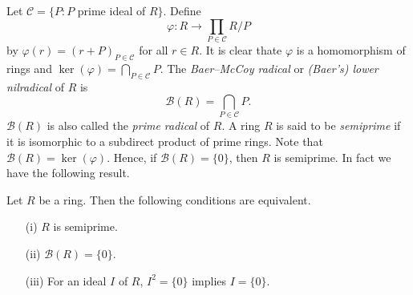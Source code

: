 Let $\mathcal{C}=\{ P : P$ prime ideal of $R\}$. Define
\[
\varphi\colon R\rightarrow \prod_{P\in\mathcal{C}}R/P
\]
by $\varphi (r)=(r+P)_{P\in\mathcal{C}}$ for all $r\in R$. It is clear thate $\varphi$ 
is a homomorphism of rings and $\ker(\varphi
)=\bigcap_{P\in \mathcal{C}}P$. The \emph{Baer--McCoy radical} or \emph{(Baer's) lower nilradical} of $R$ is
$$\mathcal{B}(R)=\bigcap_{P\in\mathcal{C}}P.$$
$\mathcal{B}(R)$ is also called the \emph{prime radical} of $R$.
A ring $R$ is said to be \emph{semiprime} if it is isomorphic to a subdirect product of prime rings.
Note that $\mathcal{B}(R)=\ker(\varphi)$. Hence, if $\mathcal{B}(R)=\{0\}$, then $R$ is semiprime. 
In fact we have the following result.

\begin{theorem}\label{Teorema 1.3.6}
Let $R$ be a ring. Then the following conditions are equivalent.
\begin{itemize}\item[(i)] $R$ is semiprime.
\item[(ii)] $\mathcal{B}(R)=\{0\}$.
\item[(iii)] For an ideal $I$ of $R$, $I^2=\{0\}$ implies $I=\{0\}$.
\end{itemize}
\end{theorem}

